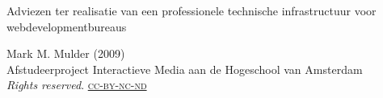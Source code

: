 \thispagestyle{empty}

\begin{flushleft}

  \Huge
  Adviezen ter realisatie van een professionele technische infrastructuur voor webdevelopmentbureaus\\

  \vfill{}
  
  \small
  Mark M. Mulder (2009) \\
  Afstudeerproject Interactieve Media aan de Hogeschool van Amsterdam
  \\\emph{Rights reserved}.  \href{http://creativecommons.org/licenses/by-nc-nd/3.0/nl/}{\textsc{cc-by-nc-nd}}
  
\end{flushleft}

\normalsize
